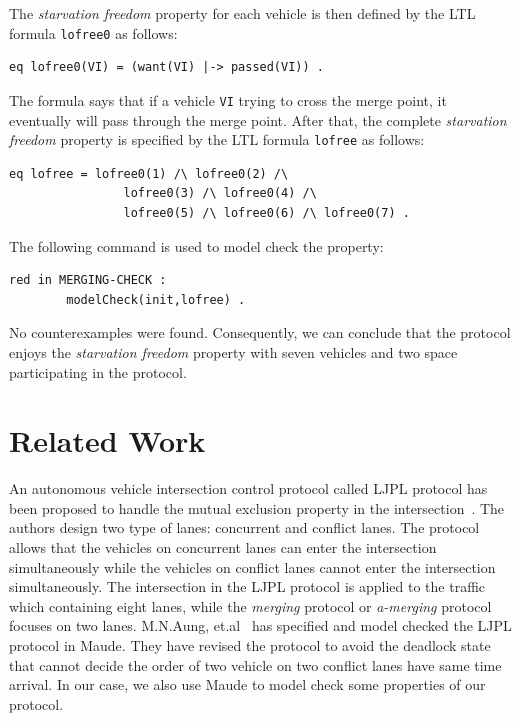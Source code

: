 \documentclass[10pt, conference, compsocconf]{IEEEtran}
\begin{document}
The \textit{starvation freedom} property for each vehicle is then 
defined by the LTL formula \verb!lofree0! as follows:

\begin{small}
\begin{verbatim}
eq lofree0(VI) = (want(VI) |-> passed(VI)) .
\end{verbatim}
\end{small}

\noindent
The formula says that if a vehicle \verb!VI! trying to cross the merge point, 
it eventually will pass through the merge point.
After that, the complete \textit{starvation freedom} property is specified 
by the LTL formula \verb!lofree! as follows:

\begin{small}
\begin{verbatim}
eq lofree = lofree0(1) /\ lofree0(2) /\ 
				lofree0(3) /\ lofree0(4) /\ 
				lofree0(5) /\ lofree0(6) /\ lofree0(7) .
\end{verbatim}
\end{small}

The following command is used to model check the property:
\begin{small}
\begin{verbatim}
red in MERGING-CHECK : 
        modelCheck(init,lofree) .
\end{verbatim}
\end{small}

\noindent
No counterexamples were found. 
Consequently, we can conclude that the protocol enjoys the \textit{starvation freedom} 
property with seven vehicles and two space participating in the protocol.
 
\section{Related Work}
 \label{sect_Relate}
 
An autonomous vehicle intersection control protocol called LJPL protocol has 
been proposed to handle the mutual exclusion property in the intersection~\cite{LimJongBeom2018Aedm}.
The authors design two type of lanes: concurrent and conflict lanes. 
The protocol allows that the vehicles on concurrent lanes can enter the 
intersection simultaneously while the vehicles on conflict lanes cannot 
enter the intersection simultaneously.
The intersection in the LJPL protocol is applied to the traffic which 
containing eight lanes, while the \textit{merging} protocol or \textit{a-merging} 
protocol focuses on two lanes.
M.N.Aung, et.al~\cite{DBLP:conf/seke/AungP019} has specified and model 
checked the LJPL protocol in Maude.
They have revised the protocol to avoid the deadlock state that cannot 
decide the order of two vehicle on two conflict lanes have same time arrival.
In our case, we also use Maude to model check some properties of our protocol.
\end{document}
